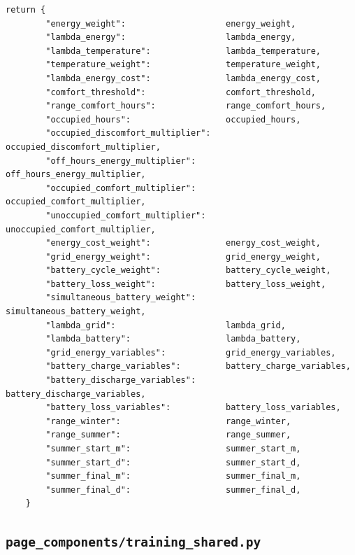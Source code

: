\documentclass[10pt,a4paper]{article}
\begin{document}
\begin{lstlisting}[style=studioPython,caption={page\_components/training\_rewards.py},label={lst:page-components-training-rewards-py}]
    return {
        "energy_weight":                    energy_weight,
        "lambda_energy":                    lambda_energy,
        "lambda_temperature":               lambda_temperature,
        "temperature_weight":               temperature_weight,
        "lambda_energy_cost":               lambda_energy_cost,
        "comfort_threshold":                comfort_threshold,
        "range_comfort_hours":              range_comfort_hours,
        "occupied_hours":                   occupied_hours,
        "occupied_discomfort_multiplier":   occupied_discomfort_multiplier,
        "off_hours_energy_multiplier":      off_hours_energy_multiplier,
        "occupied_comfort_multiplier":      occupied_comfort_multiplier,
        "unoccupied_comfort_multiplier":    unoccupied_comfort_multiplier,
        "energy_cost_weight":               energy_cost_weight,
        "grid_energy_weight":               grid_energy_weight,
        "battery_cycle_weight":             battery_cycle_weight,
        "battery_loss_weight":              battery_loss_weight,
        "simultaneous_battery_weight":      simultaneous_battery_weight,
        "lambda_grid":                      lambda_grid,
        "lambda_battery":                   lambda_battery,
        "grid_energy_variables":            grid_energy_variables,
        "battery_charge_variables":         battery_charge_variables,
        "battery_discharge_variables":      battery_discharge_variables,
        "battery_loss_variables":           battery_loss_variables,
        "range_winter":                     range_winter,
        "range_summer":                     range_summer,
        "summer_start_m":                   summer_start_m,
        "summer_start_d":                   summer_start_d,
        "summer_final_m":                   summer_final_m,
        "summer_final_d":                   summer_final_d,
    }
\end{lstlisting}


\subsection{\texorpdfstring{\texttt{page\_components/training\_shared.py}}{page\_components/training\_shared.py}}
\end{document}
